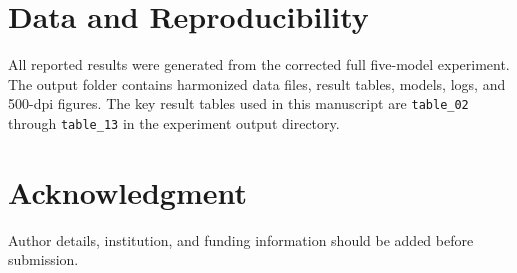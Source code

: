 \documentclass[11pt]{article}
\begin{document}
\section*{Data and Reproducibility}
All reported results were generated from the corrected full five-model experiment. The output folder contains harmonized data files, result tables, models, logs, and 500-dpi figures. The key result tables used in this manuscript are \texttt{table\_02} through \texttt{table\_13} in the experiment output directory.

\section*{Acknowledgment}
Author details, institution, and funding information should be added before submission.



\end{document}
